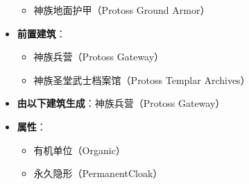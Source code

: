 \begin{tcolorbox}[colback=white, colframe=black!60!white, title=Protoss\_Dark\_Templar(), arc=0mm]
\begin{itemize}
\begin{itemize}
                \item 神族地面护甲（Protoss Ground Armor）
            \end{itemize}
        \item \textbf{前置建筑}：
            \begin{itemize}
                \item 神族兵营（Protoss Gateway）
                \item 神族圣堂武士档案馆（Protoss Templar Archives）
            \end{itemize}
        \item \textbf{由以下建筑生成}：神族兵营（Protoss Gateway）
        \item \textbf{属性}：
            \begin{itemize}
                \item 有机单位（Organic）
                \item 永久隐形（PermanentCloak）
            \end{itemize}
    \end{itemize}
\end{tcolorbox}

